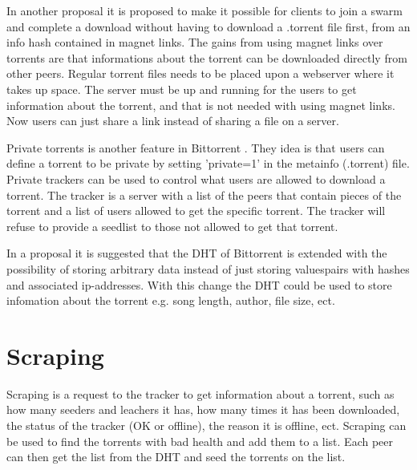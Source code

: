 In another proposal \citep{bittorrent:bep09} it is proposed to make it possible for clients to join a swarm and complete a download without having to download a .torrent file first, from an info hash contained in magnet links. The gains from using magnet links over torrents are that informations about the torrent can be downloaded directly from other peers. Regular torrent files needs to be placed upon a webserver where it takes up space. The server must be up and running for the users to get information about the torrent, and that is not needed with using magnet links.
Now users can just share a link instead of sharing a file on a server.

Private torrents is another feature in Bittorrent \citep{bittorrent:bep27}. They idea is that users can define a torrent to be private by setting 'private=1' in the metainfo (.torrent) file. Private trackers can be used to control what users are allowed to download a torrent. The tracker is a server with a list of the peers that contain pieces of the torrent and a list of users allowed to get the specific torrent.
The tracker will refuse to provide a seedlist to those not allowed to get that torrent.

In a proposal \citep{bittorrent:bep44} it is suggested that the \acs{DHT} of Bittorrent is extended with the possibility of storing arbitrary data instead of just storing valuespairs with hashes and associated ip-addresses.
With this change the \acs{DHT} could be used to store infomation about the torrent e.g. song length, author, file size, ect.

\section{Scraping}
Scraping is a request to the tracker to get information about a torrent, such as how many seeders and leachers it has, how many times it has been downloaded, the status of the tracker (OK or offline), the reason it is offline, ect.
Scraping can be used to find the torrents with bad health and add them to a list. Each peer can then get the list from the \acs{DHT} and seed the torrents on the list.
